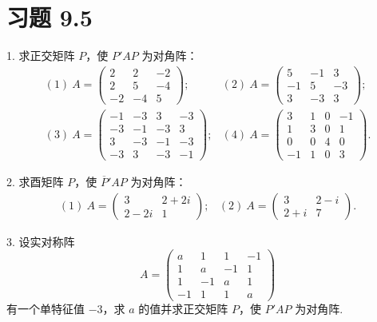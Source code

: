 \documentclass[UTF8, 12pt, fontset=fandol, oneside]{ctexart}
\begin{document}
\section*{习题 9.5}

1. 求正交矩阵 $P$，使 $P'AP$ 为对角阵：
\[
\begin{array}{ll}
(1)\ A=
\left(\begin{array}{ccc}
2 & 2 & -2\\
2 & 5 & -4\\
-2 & -4 & 5
\end{array}\right);
&
(2)\ A=
\left(\begin{array}{ccc}
5 & -1 & 3\\
-1 & 5 & -3\\
3 & -3 & 3
\end{array}\right);
\\[3em]
(3)\ A=
\left(\begin{array}{rrrr}
-1 & -3 & 3 & -3\\
-3 & -1 & -3 & 3\\
3 & -3 & -1 & -3\\
-3 & 3 & -3 & -1
\end{array}\right);
&
(4)\ A=
\left(\begin{array}{rrrr}
3 & 1 & 0 & -1\\
1 & 3 & 0 & 1\\
0 & 0 & 4 & 0\\
-1 & 1 & 0 & 3
\end{array}\right).
\end{array}
\]

2. 求酉矩阵 $P$，使 $\overline P'AP$ 为对角阵：
\[
\begin{array}{ll}
(1)\ A=
\left(\begin{array}{cc}
3 & 2+2i\\
2-2i & 1
\end{array}\right);
&
(2)\ A=
\left(\begin{array}{cc}
3 & 2-i\\
2+i & 7
\end{array}\right).
\end{array}
\]

3. 设实对称阵
\[
  A=
  \left(\begin{array}{rrrr}
    a & 1 & 1 & -1\\
    1 & a & -1 & 1\\
    1 & -1 & a & 1\\
    -1 & 1 & 1 & a
  \end{array}\right)
\]
有一个单特征值 $-3$，求 $a$ 的值并求正交矩阵 $P$，使 $P'AP$ 为对角阵.
\end{document}
